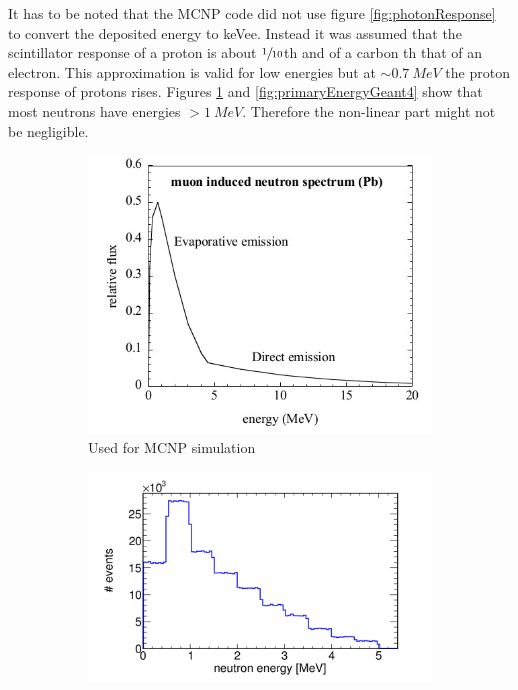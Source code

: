 \documentclass[12pt]{article}
\begin{document}
 It has to be noted that \label{part:eResponse} the MCNP code did not use figure \ref{fig:photonResponse} to convert the deposited energy to keVee. Instead it was assumed that the scintillator response of a proton is about $\sfrac{1}{10}$\hspace{2pt}th and of a carbon \hspace{2pt}th that of an electron. This approximation is valid for low energies but at $\sim\SI{0.7}{MeV}$ the proton response of protons rises. 
 Figures \ref{fig:primaryEnergyMCNP} and \ref{fig:primaryEnergyGeant4} show that most neutrons have energies $>\SI{1}{MeV}$. Therefore the non-linear part might not be negligible.
  \begin{figure}[htbp]
  	  		\centering
  	\begin{subfigure}[t]{0.4\textwidth}
  		\includegraphics[width=\textwidth]{./pics/primaryEnergy_orig.jpg}
  		\caption{Used for MCNP simulation}
  		\label{fig:primaryEnergyMCNP}
  	\end{subfigure}
  	\begin{subfigure}[t]{0.55\textwidth}
  		\includegraphics[width=\textwidth]{./pics/primaryEnergy.jpg}

\end{subfigure}
\end{figure}
\end{document}
